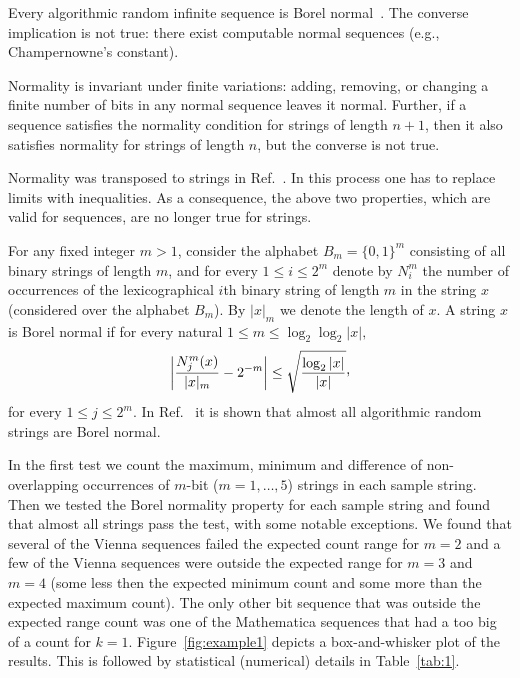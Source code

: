 \documentclass[%
 preprint,
 showpacs,
 showkeys,
 preprintnumbers,
 amsmath,amssymb,
 aps,
 prl,
  longbibliography,
 ]{revtex4-1}
\begin{document}
Every algorithmic random infinite sequence is Borel normal~\cite{DBLP:conf/dlt/Calude93}.
 The converse implication is not true:
there exist computable normal sequences (e.g.,  Champernowne's constant).


Normality is invariant under finite variations: adding, removing, or changing a finite number of bits in any normal sequence leaves it normal. Further, if a sequence satisfies the normality condition
for strings of length $n+1$, then it also satisfies normality for strings of length $n$, but the converse is not true.

Normality was transposed to  strings in Ref.~\cite{DBLP:conf/dlt/Calude93}. In this process one  has to replace limits with inequalities. As a consequence, the above two properties, which are valid for sequences, are no longer true for strings.



For any fixed  integer $m > 1$, consider the alphabet $B_{m} = \{0,1\}^{m}$ consisting of all binary strings of length $m$,
 and for
every $1 \leq i \leq 2^{m}$ denote by $N_{i}^{m}$ the
 number of occurrences of the lexicographical $i$th binary string of length $m$ in the string $x$ (considered over the alphabet $B_{m}$).
 By $|x|_{m}$ we denote the length of $x$.
 A string $x$ is Borel normal if
  for every natural $1 \leq m \leq \log_{2}\log_{2} |x|,$
  \[
\left| \frac{N_{j}^{m}(x)}{|x|_{m}} -  2^{-m} \right| \leq
\sqrt\frac{\log_{2}|x|}{|x|}\raisebox{0.5ex}{,}\]
for every $1 \leq j \leq 2^{m}$.
In Ref.~\cite{DBLP:conf/dlt/Calude93}
it is shown that almost all algorithmic random strings are Borel normal.


In the first test
we  count the maximum, minimum and difference of non-overlapping occurrences of  $m$-bit ($m=1,\ldots , 5$) strings  in
each sample string.   Then we tested the Borel normality property for each sample string and found that
almost all strings pass the  test,  with some notable exceptions.
We found that several of the Vienna sequences failed the expected count range for
$m=2$ and a few of the Vienna sequences were outside the expected range for $m=3$
and $m=4$ (some less then the expected minimum count and some more than the expected
maximum count).  The only other bit sequence that was outside the expected range
count was one of the Mathematica sequences that had a too big of a count for $k=1$.
%
Figure~\ref{fig:example1} depicts a box-and-whisker plot of the
results. This is followed by statistical (numerical) details
in Table~\ref{tab:1}.
\end{document}

